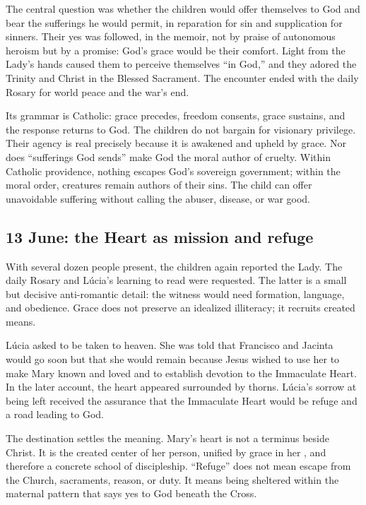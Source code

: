 The central question was whether the children would offer themselves to God and bear the sufferings he would permit, in reparation for sin and supplication for sinners. Their yes was followed, in the memoir, not by praise of autonomous heroism but by a promise: God's grace would be their comfort. Light from the Lady's hands caused them to perceive themselves “in God,” and they adored the Trinity and Christ in the Blessed Sacrament. The encounter ended with the daily Rosary for world peace and the war's end.

Its grammar is Catholic: grace precedes, freedom consents, grace sustains, and the response returns to God. The children do not bargain for visionary privilege. Their agency is real precisely because it is awakened and upheld by grace. Nor does “sufferings God sends” make God the moral author of cruelty. Within Catholic providence, nothing escapes God's sovereign government; within the moral order, creatures remain authors of their sins. The child can offer unavoidable suffering without calling the abuser, disease, or war good.

\subsection{13 June: the Heart as mission and refuge}

With several dozen people present, the children again reported the Lady. The daily Rosary and Lúcia's learning to read were requested. The latter is a small but decisive anti-romantic detail: the witness would need formation, language, and obedience. Grace does not preserve an idealized illiteracy; it recruits created means.

Lúcia asked to be taken to heaven. She was told that Francisco and Jacinta would go soon but that she would remain because Jesus wished to use her to make Mary known and loved and to establish devotion to the Immaculate Heart. In the later account, the heart appeared surrounded by thorns. Lúcia's sorrow at being left received the assurance that the Immaculate Heart would be refuge and a road leading to God.

The destination settles the meaning. Mary's heart is not a terminus beside Christ. It is the created center of her person, unified by grace in her , and therefore a concrete school of discipleship. “Refuge” does not mean escape from the Church, sacraments, reason, or duty. It means being sheltered within the maternal pattern that says yes to God beneath the Cross.

